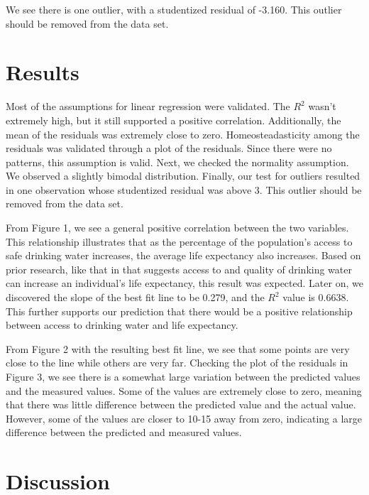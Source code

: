 \documentclass[12pt]{article}
\begin{document}
\noindent
We see there is one outlier, with a studentized residual of -3.160. This outlier should be removed from the data set.

\section{Results}

\noindent
Most of the assumptions for linear regression were validated. The $R^2$ wasn't extremely high, but it still supported a positive correlation. Additionally, the mean of the residuals was extremely close to zero. Homeosteadasticity among the residuals was validated through a plot of the residuals. Since there were no patterns, this assumption is valid. Next, we checked the normality assumption. We observed a slightly bimodal distribution. Finally, our test for outliers resulted in one observation whose studentized residual was above 3. This outlier should be removed from the data set.

\vspace{15pt}

\noindent
From Figure 1, we see a general positive correlation between the two variables. This relationship illustrates that as the percentage of the population's access to safe drinking water increases, the average life expectancy also increases. Based on prior research, like that in \citet{angelakis2021quality} that suggests access to and quality of drinking water can increase an individual's life expectancy, this result was expected. Later on, we discovered the slope of the best fit line to be 0.279, and the $R^2$ value is 0.6638. This further supports our prediction that there would be a positive relationship between access to drinking water and life expectancy.

\vspace{15pt}

\noindent
From Figure 2 with the resulting best fit line, we see that some points are very close to the line while others are very far. Checking the plot of the residuals in Figure 3, we see there is a somewhat large variation between the predicted values and the measured values. Some of the values are extremely close to zero, meaning that there was little difference between the predicted value and the actual value. However, some of the values are closer to 10-15 away from zero, indicating a large difference between the predicted and measured values.

\section{Discussion}
\end{document}
